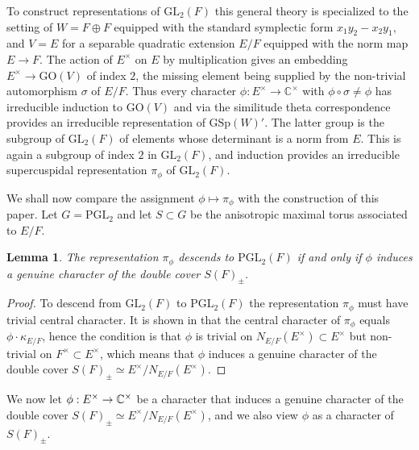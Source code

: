 \documentclass{article}
\def\tx#1{\textrm{#1}}
\def\C{\mathbb{C}}
\newcommand{\bC}{\mathbb{C}}
\newtheorem{lem}[thm]{Lemma}
\theoremstyle{definition}
\numberwithin{equation}{subsection}
\renewcommand{\-}{\hyp{}}
\begin{document}
To construct representations of $\tx{GL}_2(F)$ this general theory is specialized to the setting of $W=F \oplus F$ equipped with the standard symplectic form $x_1y_2-x_2y_1$, and $V=E$ for a separable quadratic extension $E/F$ equipped with the norm map $E \to F$. The action of $E^\times$ on $E$ by multiplication gives an embedding $E^\times \to \tx{GO}(V)$ of index $2$, the missing element being supplied by the non-trivial automorphism $\sigma$ of $E/F$. Thus every character $\phi : E^\times \to \C^\times$ with $\phi\circ \sigma \neq \phi$ has irreducible induction to $\tx{GO}(V)$ and via the similitude theta correspondence provides an irreducible representation of $\tx{GSp}(W)'$. The latter group is the subgroup of $\tx{GL}_2(F)$ of elements whose determinant is a norm from $E$. This is again a subgroup of index $2$ in $\tx{GL}_2(F)$, and induction provides an irreducible supercuspidal representation $\pi_\phi$ of $\tx{GL}_2(F)$.

We shall now compare the assignment $\phi \mapsto \pi_\phi$ with the construction of this paper. Let $G=\tx{PGL}_2$ and let $S \subset G$ be the anisotropic maximal torus associated to $E/F$. 

\begin{lem}
	The representation $\pi_\phi$ descends to $\mathrm{PGL}_2(F)$ if and only if $\phi$ induces a genuine character of the double cover $S(F)_\pm$.
\end{lem}
\begin{proof}
To descend from $\tx{GL}_2(F)$ to $\tx{PGL}_2(F)$ the representation $\pi_\phi$ must have trivial central character. It is shown in \cite[Proposition 39.2(3)]{BH06} that the central character of $\pi_\phi$ equals $\phi \cdot \kappa_{E/F}$, hence the condition is that $\phi$ is trivial on $N_{E/F}(E^\times) \subset E^\times$ but non-trivial on $F^\times \subset E^\times$, which means that $\phi$ induces a genuine character of the double cover $S(F)_{\pm} \simeq E^\times/N_{E/F}(E^\times)$.
\end{proof}

We now let $\phi: E^\times \ra \bC^\times$ be a character that induces a genuine character of the double cover $S(F)_{\pm} \simeq E^\times/N_{E/F}(E^\times)$, and we also view $\phi$ as a character of $S(F)_{\pm}$.
\end{document}
